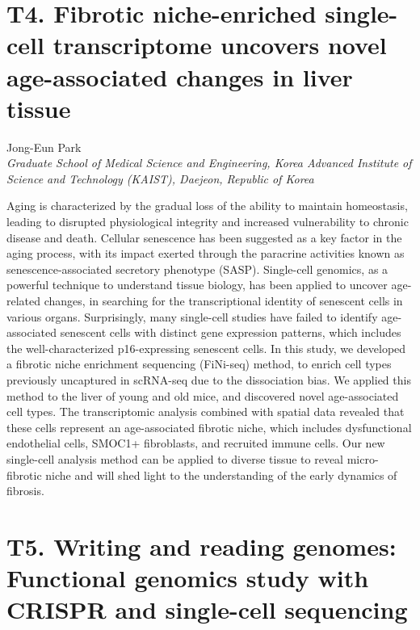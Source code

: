 \section*{T4. Fibrotic niche-enriched single-cell transcriptome uncovers novel age-associated changes in liver tissue}

\begin{center}
Jong-Eun Park \\
\vspace{0.3cm}
\textit{Graduate School of Medical Science and Engineering, Korea Advanced Institute of Science and Technology (KAIST), Daejeon, Republic of Korea} \\
\end{center}

\noindent
Aging is characterized by the gradual loss of the ability to maintain homeostasis, leading to disrupted physiological integrity and increased vulnerability to chronic disease and death. Cellular senescence has been suggested as a key factor in the aging process, with its impact exerted through the paracrine activities known as senescence-associated secretory phenotype (SASP). Single-cell genomics, as a powerful technique to understand tissue biology, has been applied to uncover age-related changes, in searching for the transcriptional identity of senescent cells in various organs. Surprisingly, many single-cell studies have failed to identify age-associated senescent cells with distinct gene expression patterns, which includes the well-characterized p16-expressing senescent cells. In this study, we developed a fibrotic niche enrichment sequencing (FiNi-seq) method, to enrich cell types previously uncaptured in scRNA-seq due to the dissociation bias. We applied this method to the liver of young and old mice, and discovered novel age-associated cell types. The transcriptomic analysis combined with spatial data revealed that these cells represent an age-associated fibrotic niche, which includes dysfunctional endothelial cells, SMOC1+ fibroblasts, and recruited immune cells. Our new single-cell analysis method can be applied to diverse tissue to reveal micro-fibrotic niche and will shed light to the understanding of the early dynamics of fibrosis.
\newpage

\section*{T5. Writing and reading genomes: \\ Functional genomics study with CRISPR and single-cell sequencing}

